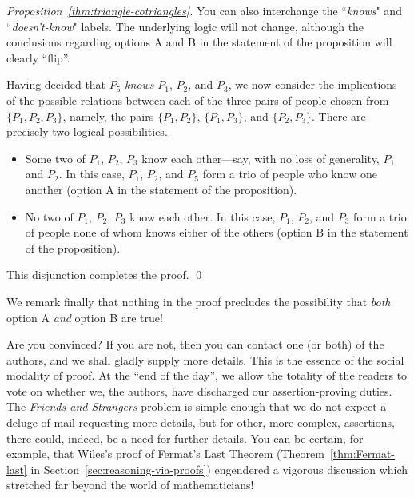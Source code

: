 \begin{proof}[Proposition~\ref{thm:triangle-cotriangles}]
{\begin{minipage}{0.96\textwidth}
\smallskip

You can also interchange the ``{\em knows}" and ``{\em doesn't-know}" labels.  The underlying logic will not change, although the conclusions regarding options A and B in the statement of the proposition will clearly ``flip''.
\end{minipage} }

\bigskip

\noindent
Having decided that $P_5$ {\em knows} $P_1$, $P_2$, and $P_3$, we now consider the implications of the possible relations between each of the three pairs of people chosen from $\{P_1, P_2, P_3\}$, namely, the pairs  $\{P_1, P_2\}$, $\{P_1, P_3\}$, and $\{P_2, P_3\}$.  There
are precisely two logical possibilities.
\begin{itemize}
\item
Some two of $P_1$, $P_2$, $P_3$ know each other---say, with no loss of generality, $P_1$ and $P_2$.  In this case, $P_1$, $P_2$, and $P_5$ form a trio of people who know one another (option A in the statement of the proposition).
\medskip\item
No two of $P_1$, $P_2$, $P_3$ know each other.  In this case, $P_1$, $P_2$, and $P_3$ form a trio of people none of whom knows either of the others (option B in the statement of the proposition).
\end{itemize}
This disjunction completes the proof.   \qed
\end{proof}

We remark finally that nothing in the proof precludes the possibility that {\em both} option A {\em and} option B are true!

\medskip

Are you convinced?  If you are not, then you can contact one (or both) of the authors, and we shall gladly supply more details.  This is the essence of the social modality of proof.  At the ``end of the day'', we allow the totality of the readers to vote on whether we, the authors, have discharged our assertion-proving duties.  The {\it Friends and Strangers} problem is simple enough that we do not expect a deluge of mail requesting more details, but for other, more complex, assertions, there could, indeed, be a need for further details.  You can be certain, for example, that Wiles's proof of Fermat's Last Theorem (Theorem~\ref{thm:Fermat-last} in Section~\ref{sec:reasoning-via-proofs}) engendered a vigorous discussion which stretched far beyond the world of mathematicians!

\bigskip

